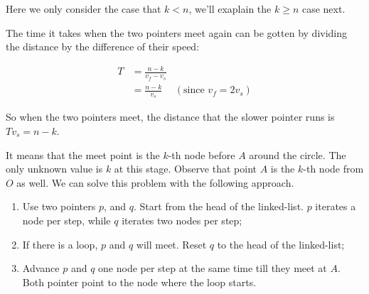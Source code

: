 \documentclass{article}
\begin{document}
Here we only consider the case that $k < n$, we'll exaplain the $k \geq n$ case next.

The time it takes when the two pointers meet again can be gotten by dividing the distance by
the difference of their speed:

\begin{equation}
\begin{array}{rlr}
T & = \displaystyle \frac{n-k}{v_f - v_s} & \\
  & = \displaystyle \frac{n-k}{v_s} & (\textrm{since } v_f = 2v_s)
\end{array}
\end{equation}

So when the two pointers meet, the distance that the slower pointer runs is $Tv_s = n - k$.

It means that the meet point is the $k$-th node before $A$ around the circle.
The only unknown value
is $k$ at this stage. Observe that point $A$ is the $k$-th node from $O$ as well.
We can solve this problem with the following approach.

\begin{enumerate}
\item Use two pointers $p$, and $q$. Start from the head of the linked-list. $p$ iterates
a node per step, while $q$ iterates two nodes per step;
\item If there is a loop, $p$ and $q$ will meet. Reset $q$ to the head of the linked-list;
\item Advance $p$ and $q$ one node per step at the same time till they meet at $A$. Both
pointer point to the node where the loop starts.
\end{enumerate}
\end{document}
